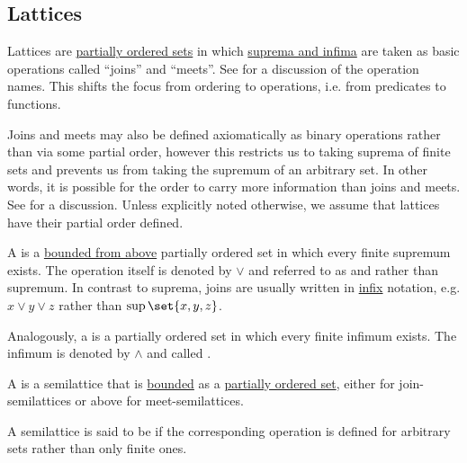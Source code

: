 \subsection{Lattices}\label{subsec:lattices}

\begin{definition}\label{def:semilattice}
  Lattices are \hyperref[def:partially_ordered_set]{partially ordered sets} in which \hyperref[def:partially_ordered_set_extremal_points/supremum_and_infimum]{suprema and infima} are taken as basic operations called \enquote{joins} and \enquote{meets}. See  for a discussion of the operation names. This shifts the focus from ordering to operations, i.e. from predicates to functions.

  Joins and meets may also be defined axiomatically as binary operations rather than via some partial order, however this restricts us to taking suprema of finite sets and prevents us from taking the supremum of an arbitrary set. In other words, it is possible for the order to carry more information than joins and meets. See  for a discussion. Unless explicitly noted otherwise, we assume that lattices have their partial order defined.

  \begin{thmenum}[series=def:semilattice]
     A  is a \hyperref[def:partially_ordered_set_extremal_points/top_and_bottom]{bounded from above} partially ordered set in which every finite supremum exists. The operation itself is denoted by \( \vee \) and referred to as  and rather than supremum. In contrast to suprema, joins are usually written in \hyperref[rem:first_order_formula_conventions/infix]{infix} notation, e.g. \( x \vee y \vee z \) rather than \( \sup\set{ x, y, z } \).

     Analogously, a  is a partially ordered set in which every finite infimum exists. The infimum is denoted by \( \wedge \) and called .

     A  is a semilattice that is \hyperref[def:partially_ordered_set_extremal_points/top_and_bottom]{bounded} as a \hyperref[def:partially_ordered_set]{partially ordered set}, either  for join-semilattices or  above for meet-semilattices.

     A semilattice is said to be  if the corresponding operation is defined for arbitrary sets rather than only finite ones.


\end{thmenum}
\end{definition}
